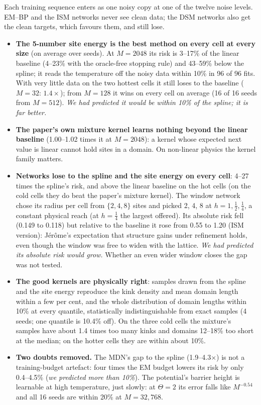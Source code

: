 \documentclass[11pt,a4paper]{article}
\newcommand{\fals}[1]{{\small\itshape #1}}
\begin{document}
Each training sequence enters as one noisy copy at one of the twelve noise levels. EM--BP and the ISM networks never see clean
data; the DSM networks also get the clean targets, which favours them, and still lose.
\begin{itemize}
\item \textbf{The 5-number site energy is the best method on every cell at every size} (on average over seeds). At $M=2048$ its risk is
3--17\% of the linear baseline (4--23\% with the oracle-free stopping rule) and 43--59\% below the spline; it reads the temperature off
the noisy data within 10\% in 96 of 96 fits. With very little data on the two hottest cells it still loses to the baseline ($M=32$: $1.4\times$); from
$M=128$ it wins on every cell on average (16 of 16 seeds from $M=512$). \fals{We had predicted it would be within 10\% of the
spline; it is far better.}
\item \textbf{The paper's own mixture kernel learns nothing beyond the linear baseline} (1.00--1.02 times it at $M=2048$): a kernel whose
expected next value is linear cannot hold sites in a domain. On non-linear physics the kernel family matters.
\item \textbf{Networks lose to the spline and the site energy on every cell}: 4--27 times the spline's risk, and above the linear
baseline on the hot cells (on the cold cells they do beat the paper's mixture kernel). The window network chose its radius per cell from $\{2,4,8\}$ sites and picked 2, 4, 8 at $h=1,\tfrac12,\tfrac14$, a constant
physical reach (at $h=\tfrac14$ the largest offered). Its absolute risk fell (0.149 to 0.118) but relative to the baseline it rose from
0.55 to 1.20 (ISM version): Jérôme's expectation that structure gains under refinement holds, even though the window was free to
widen with the lattice. \fals{We had predicted its absolute risk would
grow.} Whether an even wider window closes the gap was not tested.
\item \textbf{The good kernels are physically right}: samples drawn from the spline and the site energy reproduce the kink density and
mean domain length within a few per cent, and the whole distribution of domain lengths within 10\% at every quantile,
statistically indistinguishable from exact samples (4 seeds; one quantile is 10.4\% off). On the three cold cells the mixture's
samples have about 1.4 times too many kinks and domains 12--18\% too short at the median; on the hotter cells they are within
about 10\%.
\item \textbf{Two doubts removed.} The MDN's gap to the spline (1.9--4.3$\times$) is not a training-budget artefact: four times the EM budget lowers its risk by only
0.4--4.5\% (\fals{we predicted more than 10\%}). The potential's barrier height is learnable at high temperature, just slowly: at
$\Theta=2$ its error falls like $M^{-0.54}$ and all 16 seeds are within 20\% at $M=32{,}768$.
\end{itemize}
\end{document}
